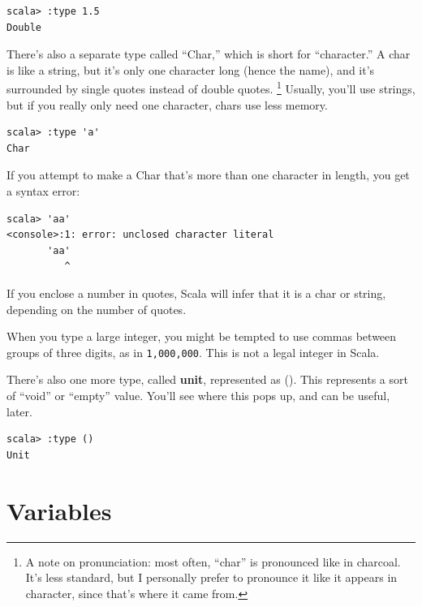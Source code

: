 \documentclass[10pt]{book}
\begin{document}

\beforeverb
\begin{verbatim}
scala> :type 1.5
Double
\end{verbatim}
\afterverb

There's also a separate type called ``Char,'' which is short for ``character.'' 
A char is like a string, but it's only one character long (hence the name), and it's surrounded 
by single quotes instead of double quotes. \footnote{A note on pronunciation: most often, ``char''
 is pronounced like in charcoal. 
It's less standard, but I personally prefer to pronounce it like it appears in character, since 
that's where it came from.} Usually, you'll use strings, but if you really only need one character,
 chars use less memory.


\beforeverb
\begin{verbatim}
scala> :type 'a'
Char
\end{verbatim}
\afterverb

If you attempt to make a Char that's more than one character in length, you get a syntax error:

\beforeverb
\begin{verbatim}
scala> 'aa'
<console>:1: error: unclosed character literal
       'aa'
          ^
\end{verbatim}
\afterverb

If you enclose a number in quotes, Scala will infer that it is a char or string, 
depending on the number of quotes.

When you type a large integer, you might be tempted to use commas
between groups of three digits, as in {\tt 1,000,000}.  This is not a
legal integer in Scala.

There's also one more type, called {\bf unit}, represented as (). This represents 
a sort of ``void''  or ``empty'' value. You'll see where this pops up, and can be useful, later.

\beforeverb
\begin{verbatim}
scala> :type ()
Unit
\end{verbatim}
\afterverb


\section{Variables}
\end{document}
